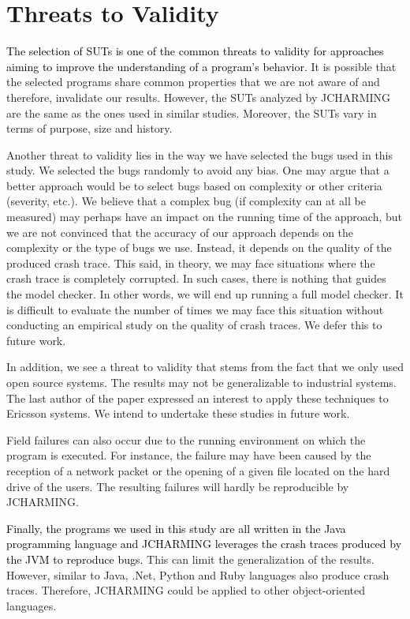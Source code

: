 \documentclass[times, doublespace]{smrauth}
\newcommand{\red}[1]{\textcolor{black}{#1}}
\begin{document}
\section{Threats to Validity\label{sec:threats}}

\red{The selection of SUTs is one of the common threats to validity
for approaches aiming to improve the understanding of a
program's behavior.} It is possible that the selected programs
share common properties that we are not aware of and
therefore, invalidate our results. However, the SUTs analyzed
by JCHARMING are the same as the ones used in similar
studies. Moreover, the SUTs vary in terms of purpose, size
and history.

Another threat to validity lies in the way we have selected the
bugs used in this study. We selected the bugs randomly to
avoid any bias. One may argue that a better approach would
be to select bugs based on complexity or other criteria
(severity, etc.). We believe that a complex bug (if complexity
can at all be measured) may perhaps have an impact on the
running time of the approach, but we are not convinced that
the accuracy of our approach depends on the complexity or the
type of bugs we use. Instead, it depends on the quality of the
produced crash trace. This said, in theory, we may face situations where the crash trace is completely corrupted. In such cases, there is nothing that guides the model checker. In other words, we will end up
running a full model checker. It is difficult to evaluate the number of times we may face this situation without conducting an empirical study on the quality of crash traces. We defer this to future work.

In addition, we see a threat to validity that stems from the fact
that we only used open source systems. The results may not be
generalizable to industrial systems. The last author of the
paper expressed an interest to apply these techniques to
Ericsson systems. We intend to undertake these studies in
future work.

Field failures can also occur due to the running environment
on which the program is executed. For instance, the failure
may have been caused by the reception of a network packet or
the opening of a given file located on the hard drive of the
users. The resulting failures will hardly be reproducible by
JCHARMING.

\red{Finally, the programs we used in this study are all written in
the Java programming language and JCHARMING leverages
the crash traces produced by the JVM to reproduce bugs.} This
can limit the generalization of the results. However, similar to
Java, .Net, Python and Ruby languages also produce crash
traces. Therefore, JCHARMING could be applied to other
object-oriented languages.
\end{document}
